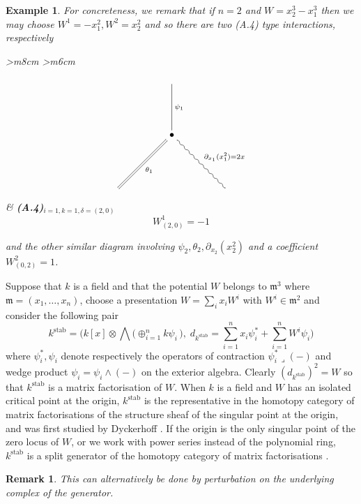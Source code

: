 \documentclass[english,letter paper,12pt,leqno]{article}
\theoremstyle{example}
\newtheorem{example}[theorem]{Example}
\newtheorem{remark}[theorem]{Remark}
\numberwithin{equation}{section}
\def\stab{\operatorname{stab}}
\begin{document}
\begin{example}
For concreteness, we remark that if $n = 2$ and $W = x_2^3 - x_1^3$ then we may choose $W^1 = -x_1^2, W^2 = x_2^2$ and so there are two (A.4) type interactions, respectively
\begin{center}
\begin{tabular}{ >{\centering}m{8cm} >{\centering}m{6cm} }
\[
\xymatrix@C+2pc@R+2pc{
& \ar@{-}[d]^-{\psi_1}\\
& \bullet \ar@{=}[dl]^-{\theta_1} \ar@{~}[dr]^-{\partial_{x_1}(x_1^2) = 2x}\\
& &
}
\]
&
\textbf{(A.4)}$_{i=1,k=1,\delta=(2,0)}$
\vspace{1cm}
\[ W^1_{(2,0)} = -1 \]
\end{tabular}
\end{center}
and the other similar diagram involving $\psi_2, \theta_2, \partial_{x_2}(x_2^2)$ and a coefficient $W^2_{(0,2)} = 1$. 
\end{example}

Suppose that $k$ is a field and that the potential $W$ belongs to $\mathfrak{m}^3$ where $\mathfrak{m} = (x_1,\ldots,x_n)$, choose a presentation $W = \sum_i x_i W^i$ with $W^i \in \mathfrak{m}^2$ and consider the following pair
\begin{equation}\label{eq:kstab}
k^{\operatorname{stab}} = \Big( k[x] \otimes \bigwedge\big( \oplus_{i=1}^n k\psi_i \,\big), \;d_{k^{\stab}} = \sum_{i=1}^n x_i \psi_i^* + \sum_{i=1}^n W^i \psi_i \Big)
\end{equation}
where $\psi_i^*, \psi_i$ denote respectively the operators of contraction $\psi_i^* \lrcorner (-)$ and wedge product $\psi_i = \psi_i \wedge (-)$ on the exterior algebra. Clearly $(d_{k^{\stab}})^2 = W$ so that $k^{\stab}$ is a matrix factorisation of $W$. When $k$ is a field and $W$ has an isolated critical point at the origin, $k^{\stab}$ is the representative in the homotopy category of matrix factorisations of the structure sheaf of the singular point at the origin, and was first studied by Dyckerhoff \cite{d0904.4713}. If the origin is the only singular point of the zero locus of $W$, or we work with power series instead of the polynomial ring, $k^{\stab}$ is a split generator of the homotopy category of matrix factorisations \cite[Theorem ?]{?}.

\begin{remark} This can alternatively be done by perturbation on the underlying complex of the generator.
\end{remark}
\end{document}
